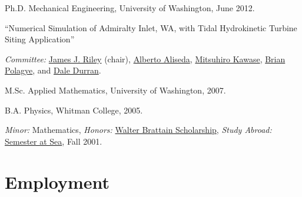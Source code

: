 \documentclass[10pt,letterpaper]{article}
\renewenvironment{itemize}{
  \begin{list}{}{
    \setlength{\leftmargin}{1.5em}
    \setlength{\itemsep}{0.25em}
    \setlength{\parskip}{0pt}
    \setlength{\parsep}{0.25em}
  }
}{
  \end{list}
}
\begin{document}
\begin{itemize}

  \item Ph.D. Mechanical Engineering, University of Washington, June 2012.

    \begin{itemize}
	\item   ``Numerical Simulation of Admiralty Inlet, WA, with Tidal Hydrokinetic Turbine Siting Application''
    \item \textit{Committee:}
      \href{http://faculty.washington.edu/rileyj/}{James J. Riley} (chair),
      \href{http://www.me.washington.edu/research/faculty/aaliseda/}{Alberto Aliseda},
      \href{http://faculty.washington.edu/kawase/}{Mitsuhiro Kawase},
      \href{http://www.me.washington.edu/research/faculty/bpolagye/}{Brian Polagye}, and
      \href{http://www.atmos.washington.edu/~durrand/}{Dale Durran}.

    \end{itemize}

  \item M.Sc. Applied Mathematics, University of Washington, 2007.

  \item B.A. Physics, Whitman College, 2005.

    \begin{itemize}

    \item \textit{Minor:} Mathematics, \textit{Honors:} \href{https://www.whitman.edu/content/catalog/financial-aid}{Walter Brattain Scholarship}, \textit{Study Abroad:}
      \href{http://www.semesteratsea.org/}{Semester at Sea},
      Fall 2001.

    \end{itemize}
%
%    
%
%

\end{itemize}

\section*{Employment}
\end{document}
